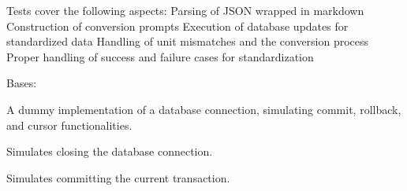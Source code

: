 \documentclass[letterpaper,10pt,english]{sphinxmanual}
\begin{document}
\sphinxAtStartPar
Tests cover the following aspects:
\sphinxhyphen{} Parsing of JSON wrapped in markdown
\sphinxhyphen{} Construction of conversion prompts
\sphinxhyphen{} Execution of database updates for standardized data
\sphinxhyphen{} Handling of unit mismatches and the conversion process
\sphinxhyphen{} Proper handling of success and failure cases for standardization

\begin{fulllineitems}
\label{\detokenize{test.data_storage:test.data_storage.test_llm_standardize.DummyConnection}}
\pysigstartsignatures
\pysigline
{}
\pysigstopsignatures
\sphinxAtStartPar
Bases: 

\sphinxAtStartPar
A dummy implementation of a database connection, simulating commit, rollback, and cursor functionalities.

\begin{fulllineitems}
\label{\detokenize{test.data_storage:test.data_storage.test_llm_standardize.DummyConnection.close}}
\pysigstartsignatures
\pysiglinewithargsret
{}
{}
{}
\pysigstopsignatures
\sphinxAtStartPar
Simulates closing the database connection.

\end{fulllineitems}


\begin{fulllineitems}
\label{\detokenize{test.data_storage:test.data_storage.test_llm_standardize.DummyConnection.commit}}
\pysigstartsignatures
\pysiglinewithargsret
{}
{}
{}
\pysigstopsignatures
\sphinxAtStartPar
Simulates committing the current transaction.

\end{fulllineitems}


\end{fulllineitems}
\end{document}
